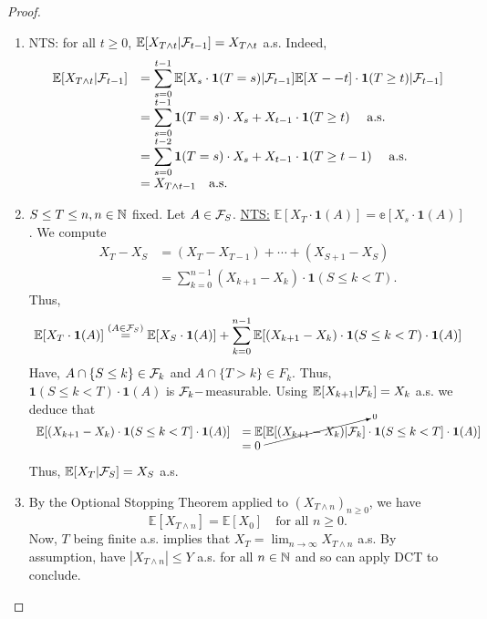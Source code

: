 \documentclass{article}
\begin{document}
\begin{proof}
    \begin{enumerate}
	    \item NTS: for all $ t\geq 0$, $ \mathbb{E}[X_{T\land t}|\mathcal{F}_{t-1}]=X_{T\land t}$ a.s.
		    Indeed, 
\[
\begin{array}{ll}
	\mathbb{E}[X_{T\land t}|\mathcal{F}_{t-1}] &=\displaystyle\sum^{t-1}_{s =0}\mathbb{E}[X_{s}\cdot \mathbf{ 1}(T=s)|\mathcal{F}_{t-1}] \mathbb{E}[X--t]\cdot \mathbf{1}(T\geq t)|\mathcal{F}_{t-1}] \\
					  &=\displaystyle\sum^{ t-1}_{s =0} \mathbf{1}(T=s)\cdot X_{s}+X_{t-1}\cdot \mathbf{1}(T\geq t) \quad \text{ a.s.}\\ 
&=\displaystyle\sum^{ t-2}_{s =0} \mathbf{1}(T=s)\cdot X_{s}+X_{t-1}\cdot \mathbf{1}(T\geq t-1) \quad \text{ a.s.}\\ 
&= X_{T\land t-1} \quad \text{a.s.}
\end{array}
\]
\item $S\leq T\leq n, n\in \mathbb{N}$ fixed. Let $ A\in \mathcal{F}_{S}$. \underline{NTS:} $ \mathbb{E}[X_{T}\cdot \mathbf{1}(A)] = \mathbb{e}[X_{s}\cdot \mathbf{1}(A)]$. We compute
	\[
	\begin{array}{ll}
	    X_{T}-X_{S} &= (X_{T}-X_{T-1})+\cdots + (X_{S+1}-X_{S}) \\
			&=\displaystyle\sum^{ n-1}_{k=0}(X_{k+1}-X_{k})\cdot \mathbf{1}(S\leq k <T). 
	\end{array}
	\]
	Thus, 
	\[
		\mathbb{E}[X_{T}\cdot \mathbf{1}(A)] \stackrel{ (A\in \mathcal{F}_{S}) }{=}\mathbb{E}[X_{S}\cdot \mathbf{1}(A)]+ \displaystyle\sum^{ n-1}_{k=0}\mathbb{E}[(X_{k+1}-X_{k})\cdot \mathbf{1}(S\leq k <T)\cdot \mathbf{1}(A)]
	\]
	Have, $ A\cap \{S\leq k\}\in \mathcal{F}_{k}$ and $ A\cap \{T>k\}\in F_{k}$. Thus, $ \mathbf{1}(S\leq k <T)\cdot \mathbf{1}(A)$ is $ \mathcal{F}_{k}-$measurable. Using $ \mathbb{E}[X_{k+1}|\mathcal{F}_{k}]=X_{k}$ a.s. we deduce that 
	\[
	\begin{array}{ll}
		\mathbb{E}[(X_{k+1}-X_{k})\cdot \mathbf{ 1}(S\leq k <T]\cdot \mathbf{1}(A)]
		&= \mathbb{E}[\smash{\cancelto{0}{\mathbb{E}[(X_{k+1}-X_{k})|\mathcal{F}_{k}]}}\cdot \mathbf{ 1}(S\leq k <T]\cdot \mathbf{1}(A)] \\
		&= 0
	\end{array}
\]
Thus, $ \mathbb{E}[X_{T}|\mathcal{F}_{S}]=X_{S}$ a.s. 

\item By the Optional Stopping Theorem applied to $ (X_{T\land n})_{n\geq 0}$, we have 
	\[
		\mathbb{E}[X_{T\land n}] =\mathbb{E}[X_{0}] \quad \text{for all } n\geq 0.
	\]
Now, $ T$ being finite a.s. implies that $ X_{T} = \displaystyle \lim_{n\to \infty} X_{T\land n} $ a.s. By assumption, have $ |X_{T\land n}|\leq Y$ a.s. for all $ n\in \mathbb{N}$ and so can apply DCT to conclude.	


\end{enumerate}
\end{proof}
\end{document}
